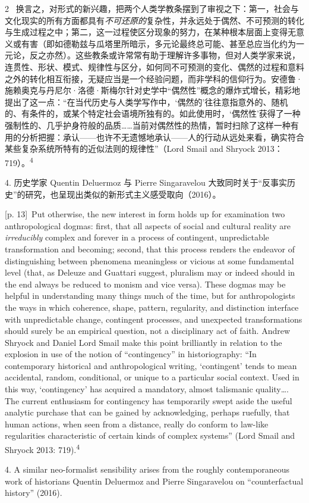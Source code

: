 \documentclass[10pt,a4paper]{article}
\begin{document}
\begin{paracol}{2}
\switchcolumn*
{\scriptsize\color{gray} [p. 13]}\ 换言之，对形式的新兴趣，把两个人类学教条摆到了审视之下：第一，社会与文化现实的所有方面都具有\textit{不可还原的}复杂性，并永远处于偶然、不可预测的转化与生成过程之中；第二，这一过程使区分现象的努力，在某种根本层面上变得无意义或有害（即如德勒兹与瓜塔里所暗示，多元论最终总可能、甚至总应当化约为一元论，反之亦然）。这些教条或许常常有助于理解许多事物，但对人类学家来说，连贯性、形状、模式、规律性与区分，如何同不可预测的变化、偶然的过程和意料之外的转化相互衔接，无疑应当是一个经验问题，而非学科的信仰行为。安德鲁·施赖奥克与丹尼尔·洛德·斯梅尔针对史学中“偶然性”概念的爆炸式增长，精彩地提出了这一点：“在当代历史与人类学写作中，‘偶然的’往往意指意外的、随机的、有条件的，或某个特定社会语境所独有的。如此使用时，‘偶然性’获得了一种强制性的、几乎护身符般的品质……当前对偶然性的热情，暂时扫除了这样一种有用的分析把握：承认——也许不无遗憾地承认——人的行动从远处来看，确实符合某些复杂系统所特有的近似法则的规律性”（Lord Smail and Shryock 2013：719）。\textsuperscript{4}\par{\small 4. 历史学家 Quentin Deluermoz 与 Pierre Singaravelou 大致同时关于“反事实历史”的研究，也呈现出类似的新形式主义感受取向（2016）。\par}
\switchcolumn
{\scriptsize\color{gray} [p. 13]}\ Put otherwise, the new interest in form holds up for examination two anthropological dogmas: first, that all aspects of social and cultural reality are \textit{irreducibly} complex and forever in a process of contingent, unpredictable transformation and becoming; second, that this process renders the endeavor of distinguishing between phenomena meaningless or vicious at some fundamental level (that, as Deleuze and Guattari suggest, pluralism may or indeed should in the end always be reduced to monism and vice versa). These dogmas may be helpful in understanding many things much of the time, but for anthropologists the ways in which coherence, shape, pattern, regularity, and distinction interface with unpredictable change, contingent processes, and unexpected transformations should surely be an empirical question, not a disciplinary act of faith. Andrew Shryock and Daniel Lord Smail make this point brilliantly in relation to the explosion in use of the notion of “contingency” in historiography: “In contemporary historical and anthropological writing, ‘contingent’ tends to mean accidental, random, conditional, or unique to a particular social context. Used in this way, ‘contingency’ has acquired a mandatory, almost talismanic quality…. The current enthusiasm for contingency has temporarily swept aside the useful analytic purchase that can be gained by acknowledging, perhaps ruefully, that human actions, when seen from a distance, really do conform to law-like regularities characteristic of certain kinds of complex systems” (Lord Smail and Shryock 2013: 719).\textsuperscript{4}\par{\small 4. A similar neo-formalist sensibility arises from the roughly contemporaneous work of historians Quentin Deluermoz and Pierre Singaravelou on “counterfactual history” (2016).\par}

\end{paracol}
\end{document}
